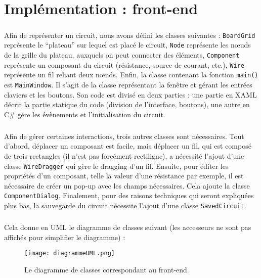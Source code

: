 \chapter{Implémentation : front-end}

\paragraph{}Afin de représenter un circuit, nous avons défini les classes suivantes : \lstinline|BoardGrid| représente le \enquote{plateau} sur lequel est placé le circuit, \lstinline|Node| représente les nœuds de la grille du plateau, auxquels on peut connecter des éléments, \lstinline|Component| représente un composant du circuit (résistance, source de courant, etc.), \lstinline|Wire| représente un fil reliant deux nœuds. Enfin, la classe contenant la fonction \lstinline|main()| est \lstinline|MainWindow|. Il s'agit de la classe représentant la fenêtre et gérant les entrées claviers et les boutons. Son code est divisé en deux parties : une partie en XAML décrit la partie statique du code (division de l'interface, boutons), une autre en C\# gère les évènements et l'initialisation du circuit.

\paragraph{}Afin de gérer certaines interactions, trois autres classes sont nécessaires. Tout d'abord, déplacer un composant est facile, mais déplacer un fil, qui est composé de trois rectangles (il n'est pas forcément rectiligne), a nécessité l'ajout d'une classe \lstinline|WireDragger| qui gère le dragging d'un fil. Ensuite, pour éditer les propriétés d'un composant, telle la valeur d'une résistance par exemple, il est nécessaire de créer un pop-up avec les champs nécessaires. Cela ajoute la classe \lstinline|ComponentDialog|. Finalement, pour des raisons techniques qui seront expliquées plus bas, la sauvegarde du circuit nécessite l'ajout d'une classe \lstinline|SavedCircuit|.

\paragraph{}Cela donne en UML le diagramme de classes suivant (les accesseurs ne sont pas affichés pour simplifier le diagramme) :

\begin{figure}[H]
	\centering
	\texttt{[image: diagrammeUML.png]}
	\caption{Le diagramme de classes correspondant au front-end.}
	\label{fig:UML}
\end{figure}


